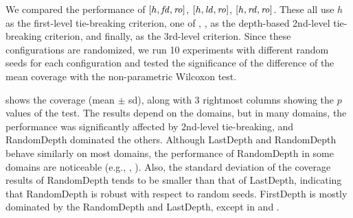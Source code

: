 
We compared the performance of
$[h,\mbox{\textit{fd}},\mbox{\textit{ro}}]$, $[h,\mbox{\textit{ld}},\mbox{\textit{ro}}]$, $[h,\mbox{\textit{rd}},\mbox{\textit{ro}}]$. These all use 
$h$ as the first-level tie-breaking criterion, one of \fd, \ld, \rd as
the depth-based 2nd-level tie-breaking criterion, and finally,
\ro as the 3rd-level criterion.
Since these configurations are randomized, we run 10
experiments with different random seeds for each configuration and
tested the significance of the difference of the mean coverage with 
the non-parametric Wilcoxon test.   %

 shows the coverage (mean $\pm$ sd),
along with 3 rightmost columns showing the $p$ values of the
test. The results depend on the domains, but in many domains,
the performance was significantly affected by 2nd-level tie-breaking, and
RandomDepth dominated the others. 
Although LastDepth and RandomDepth behave similarly on most domains, 
the performance of RandomDepth in some
domains are noticeable (e.g., , ). Also, the
standard deviation of the coverage results of RandomDepth tends to be smaller
than that of LastDepth, indicating that RandomDepth is robust with respect to random seeds.
FirstDepth is mostly dominated by the RandomDepth and LastDepth, except in 
and .


